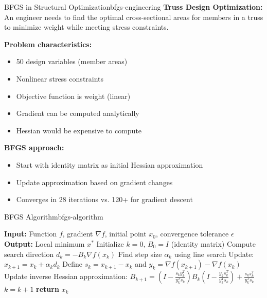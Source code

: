 \documentclass[12pt]{article}
\begin{document}
\begin{example}{BFGS in Structural Optimization}{bfgs-engineering}
\textbf{Truss Design Optimization:} An engineer needs to find the optimal cross-sectional areas for members in a truss to minimize weight while meeting stress constraints.

\textbf{Problem characteristics:}
\begin{itemize}
    \item 50 design variables (member areas)
    \item Nonlinear stress constraints
    \item Objective function is weight (linear)
    \item Gradient can be computed analytically
    \item Hessian would be expensive to compute
\end{itemize}

\textbf{BFGS approach:}
\begin{itemize}
    \item Start with identity matrix as initial Hessian approximation
    \item Update approximation based on gradient changes
    \item Converges in 28 iterations vs. 120+ for gradient descent
\end{itemize}

\begin{center}
\end{center}
\end{example}

\begin{algorithmenv}{BFGS Algorithm}{bfgs-algorithm}
\begin{algorithmic}[1]
\State \textbf{Input:} Function $f$, gradient $\nabla f$, initial point $x_0$, convergence tolerance $\epsilon$
\State \textbf{Output:} Local minimum $x^*$
\State Initialize $k = 0$, $B_0 = I$ (identity matrix)
    \State Compute search direction $d_k = -B_k \nabla f(x_k)$
    \State Find step size $\alpha_k$ using line search
    \State Update: $x_{k+1} = x_k + \alpha_k d_k$
    \State Define $s_k = x_{k+1} - x_k$ and $y_k = \nabla f(x_{k+1}) - \nabla f(x_k)$
    \State Update inverse Hessian approximation:
    \State $B_{k+1} = (I - \frac{s_k y_k^T}{y_k^T s_k})B_k(I - \frac{y_k s_k^T}{y_k^T s_k}) + \frac{s_k s_k^T}{y_k^T s_k}$
    \State $k = k + 1$
\EndWhile
\State \textbf{return} $x_k$
\end{algorithmic}
\end{algorithmenv}
\end{document}
